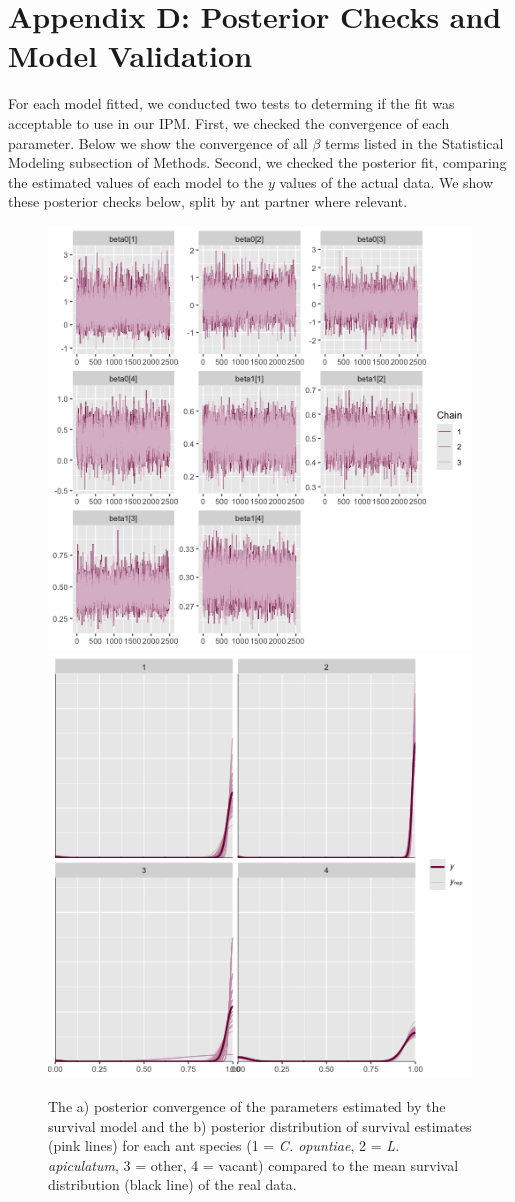 \documentclass[11pt]{article}
\begin{document}
\section*{Appendix D: Posterior Checks and Model Validation}\label{appendix:D}
For each model fitted, we conducted two tests to determing if the fit was acceptable to use in our IPM. 
First, we checked the convergence of each parameter.
Below we show the convergence of all $\beta$ terms listed in the Statistical Modeling subsection of Methods.
Second, we checked the posterior fit, comparing the estimated values of each model to the $y$ values of the actual data.
We show these posterior checks below, split by ant partner where relevant.
\begin{figure}
\includegraphics[width = 0.45\linewidth]{Figures/surv_conv.png}
\includegraphics[width=0.45\linewidth]{Figures/surv_post.png}
\caption{The a) posterior convergence of the parameters estimated by the survival model and the b) posterior distribution of survival estimates (pink lines) for each ant species (1 = \textit{C. opuntiae}, 2 = \textit{L. apiculatum}, 3 = other, 4 = vacant) compared to the mean survival distribution (black line) of the real data.}
\label{fig:Surv_post}
\end{figure}
\end{document}
